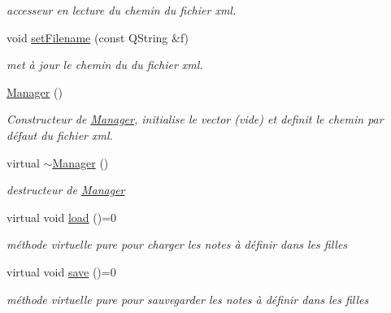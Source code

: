 \begin{DoxyCompactItemize}
\begin{DoxyCompactList}\small\item\em accesseur en lecture du chemin du fichier xml. \end{DoxyCompactList}\item 
void \hyperlink{class_manager_a5da0f2b938c233c901d1b3f56ce6b77f}{set\+Filename} (const Q\+String \&f)
\begin{DoxyCompactList}\small\item\em met à jour le chemin du du fichier xml. \end{DoxyCompactList}\item 
\mbox{\label{class_manager_a18fae41f0e313921265b84b5355ac733}} 
\hyperlink{class_manager_a18fae41f0e313921265b84b5355ac733}{Manager} ()
\begin{DoxyCompactList}\small\item\em Constructeur de \hyperlink{class_manager}{Manager}, initialise le vector (vide) et definit le chemin par défaut du fichier xml. \end{DoxyCompactList}\item 
\mbox{\label{class_manager_aa40cf01ea01fc0fdc029992ff8e8ad74}} 
virtual \hyperlink{class_manager_aa40cf01ea01fc0fdc029992ff8e8ad74}{$\sim$\+Manager} ()
\begin{DoxyCompactList}\small\item\em destructeur de \hyperlink{class_manager}{Manager} \end{DoxyCompactList}\item 
\mbox{\label{class_manager_add6a6361b3ebef4e6e744c2b12f9e57d}} 
virtual void \hyperlink{class_manager_add6a6361b3ebef4e6e744c2b12f9e57d}{load} ()=0
\begin{DoxyCompactList}\small\item\em méthode virtuelle pure pour charger les notes à définir dans les filles \end{DoxyCompactList}\item 
\mbox{\label{class_manager_a952734cfd645e6b257ef19ab06d4ded4}} 
virtual void \hyperlink{class_manager_a952734cfd645e6b257ef19ab06d4ded4}{save} ()=0
\begin{DoxyCompactList}\small\item\em méthode virtuelle pure pour sauvegarder les notes à définir dans les filles \end{DoxyCompactList}\end{DoxyCompactItemize}
